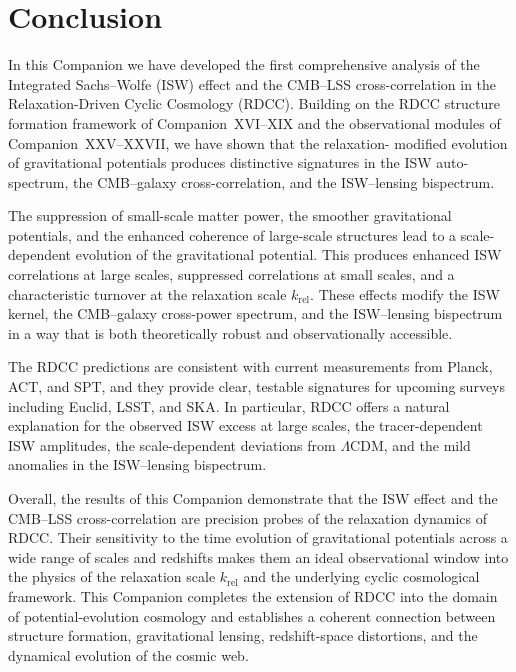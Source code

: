 \documentclass[11pt,a4paper]{article}
\begin{document}
\section{Conclusion}

In this Companion we have developed the first comprehensive analysis of the Integrated 
Sachs–Wolfe (ISW) effect and the CMB–LSS cross-correlation in the Relaxation-Driven Cyclic 
Cosmology (RDCC). Building on the RDCC structure formation framework of Companion~XVI–XIX 
and the observational modules of Companion~XXV–XXVII, we have shown that the relaxation-
modified evolution of gravitational potentials produces distinctive signatures in the ISW 
auto-spectrum, the CMB–galaxy cross-correlation, and the ISW–lensing bispectrum.

The suppression of small-scale matter power, the smoother gravitational potentials, and the 
enhanced coherence of large-scale structures lead to a scale-dependent evolution of the 
gravitational potential. This produces enhanced ISW correlations at large scales, suppressed 
correlations at small scales, and a characteristic turnover at the relaxation scale 
$k_{\mathrm{rel}}$. These effects modify the ISW kernel, the CMB–galaxy cross-power 
spectrum, and the ISW–lensing bispectrum in a way that is both theoretically robust and 
observationally accessible.

The RDCC predictions are consistent with current measurements from Planck, ACT, and SPT, and 
they provide clear, testable signatures for upcoming surveys including Euclid, LSST, and 
SKA. In particular, RDCC offers a natural explanation for the observed ISW excess at large 
scales, the tracer-dependent ISW amplitudes, the scale-dependent deviations from 
$\Lambda$CDM, and the mild anomalies in the ISW–lensing bispectrum.

Overall, the results of this Companion demonstrate that the ISW effect and the CMB–LSS 
cross-correlation are precision probes of the relaxation dynamics of RDCC. Their sensitivity 
to the time evolution of gravitational potentials across a wide range of scales and 
redshifts makes them an ideal observational window into the physics of the relaxation scale 
$k_{\mathrm{rel}}$ and the underlying cyclic cosmological framework. This Companion 
completes the extension of RDCC into the domain of potential-evolution cosmology and 
establishes a coherent connection between structure formation, gravitational lensing, 
redshift-space distortions, and the dynamical evolution of the cosmic web.
\end{document}
